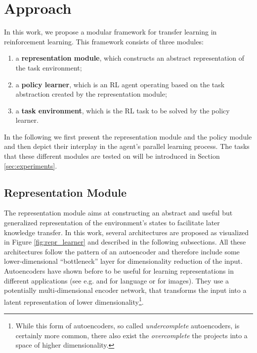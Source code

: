 
\section{Approach}
\label{sec:approach}
In this work, we propose a modular framework for transfer learning in reinforcement learning. 
This framework consists of three modules: 
\begin{enumerate}[i]
    \item a \textbf{representation module}, which constructs an abstract representation of the task environment;
    \item a \textbf{policy learner}, which is an RL agent operating based on the task abstraction created by the representation module;
    \item a \textbf{task environment}, which is the RL task to be solved by the policy learner.
\end{enumerate}
In the following we first present the representation module and the policy module and then depict their interplay in the agent's parallel learning process. The tasks that these different modules are tested on will be introduced in Section \ref{sec:experiments}.

\subsection{Representation Module}
The representation module aims at constructing an abstract and useful but generalized representation of the environment's states to facilitate later knowledge transfer.
In this work, several architectures are proposed as visualized in Figure \ref{fig:repr_learner} and described in the following subsections. 
All these architectures follow the pattern of an autoencoder \citep{ballard1987modular} and therefore include some lower-dimensional ``bottleneck'' layer for dimensionality reduction of the input. Autoencoders have shown before to be useful for learning representations \citep{bengio2012deep} in different applications (see e.g. \citet{ap2014autoencoder} and \citet{silberer2014learning} for language or \citet{wang2013learning} for images). They use a potentially multi-dimensional encoder network, that transforms the input into a latent representation of lower dimensionality\footnote{While this form of autoencoders, so called \textit{undercomplete} autoencoders, is certainly more common, there also exist the \textit{overcomplete} the projects into a space of higher dimensionality.}.

